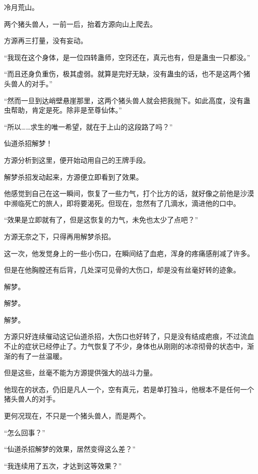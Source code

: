 
\begin{this_body}



冷月荒山。

两个猪头兽人，一前一后，抬着方源向山上爬去。

方源再三打量，没有妄动。

“我现在这个身体，是一位四转蛊师，空窍还在，真元也有，但是蛊虫一只都没。”

“而且还身负重伤，极其虚弱。就算是完好无缺，没有蛊虫的话，也不是这两个猪头兽人的对手。”

“然而一旦到达峭壁悬崖那里，这两个猪头兽人就会把我抛下。如此高度，没有蛊虫帮助，肯定是死。除非是至尊仙体。”

“所以……求生的唯一希望，就在于上山的这段路了吗？”

仙道杀招解梦！

方源分析到这里，便开始动用自己的王牌手段。

解梦杀招发动起来，方源便立即看到了效果。

他感觉到自己在这一瞬间，恢复了一些力气，打个比方的话，就好像之前他是沙漠中濒临死亡的旅人，即将要渴死。但现在，忽然有了几滴水，滴进他的口中。

“效果是立即就有了，但是这恢复的力气，未免也太少了点吧？”

方源无奈之下，只得再用解梦杀招。

这一次，他发觉身上的一些小伤口，在瞬间结了血疤，浑身的疼痛感削减了许多。

但是在他胸膛还有后背，几处深可见骨的大伤口，却是没有丝毫好转的迹象。

解梦。

解梦。

解梦。

方源只好连续催动这记仙道杀招，大伤口也好转了，只是没有结成疤痕，不过流血不止的症状已经停止了。力气恢复了不少，身体也从刚刚的冰凉彻骨的状态中，渐渐的有了一丝温暖。

但是这些，丝毫不能为方源提供强大的战斗力量。

他现在的状态，仍旧是凡人一个，空有真元，若是单打独斗，他根本不是任何一个猪头兽人的对手。

更何况现在，不只是一个猪头兽人，而是两个。

“怎么回事？”

“仙道杀招解梦的效果，居然变得这么差？”

“我连续用了五次，才达到这等效果？”


\end{this_body}
